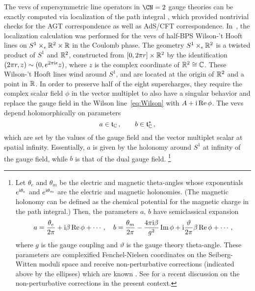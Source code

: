 The vevs of supersymmetric line operators in $\CN=2$
gauge theories can be exactly computed via
localization of the path integral \cite{Pestun:2007rz,Gomis:2011pf},
which provided nontrivial checks for the AGT correspondence
as well as AdS/CFT correspondence.
In~\cite{Ito:2011ea}, the localization calculation was performed
for the vevs of
half-BPS Wilson-'t Hooft lines on $S^1 \times_\epsilon \mathbb{R}^2 \times \mathbb{R}$ in
the Coulomb phase.
The geometry $S^1 \times_\epsilon \mathbb{R}^2$ is a twisted product of $S^1$ and
$\mathbb{R}^2$, constructed from $[0,2\pi r] \times \mathbb{R}^2$ by the
identification $(2\pi r,z) \sim (0, e^{2\pi\mathrm{i}\epsilon} z)$, where $z$ is
the complex coordinate of $\mathbb{R}^2 \cong \mathbb{C}$.  These Wilson-'t Hooft
lines wind around $S^1$, and are located at the origin of $\mathbb{R}^2$ and a
point in $\mathbb{R}$.  In order to preserve half of the eight supercharges,
they require the complex scalar field $\phi$ in the vector multiplet
to also have a singular behavior and replace the gauge field in the
Wilson line~\eqref{eq:Wilson} with $A + \mathrm{i}\mathop{\mathrm{Re}}\nolimits\phi$.  The vevs depend
holomorphically on parameters
\begin{equation}
  a \in \mathfrak{t}_{\mathbb{C}} \,,
  \qquad
  b \in \mathfrak{t}^*_{\mathbb{C}} \,,
\end{equation}
which are set by the values of the gauge field and the vector
multiplet scalar at spatial infinity.  Essentially, $a$ is given by
the holonomy around $S^1$ at infinity of the gauge field, while $b$ is
that of the dual gauge field.%
%
\footnote{Let $\theta_e$ and $\theta_m$ be the electric and magnetic theta-angles
whose exponentials $e^{\mathrm{i}\theta_e}$ and $e^{\mathrm{i}\theta_m}$ are the electric and magnetic holonomies.
(The magnetic holonomy can be defined as the chemical potential for the magnetic charge in the path integral.)
Then, the parameters $a,\,b$ have semiclassical expansion
\begin{equation}
  a = \frac{\theta_e}{2\pi} + \mathrm{i}\beta\mathop{\mathrm{Re}}\nolimits\phi + \cdots,
  \quad
  b = \frac{\theta_m}{2\pi} - \frac{4\pi\mathrm{i}\beta}{g^2}\mathop{\mathrm{Im}}\nolimits\phi + \mathrm{i}\frac{\vartheta}{2\pi}\beta\mathop{\mathrm{Re}}\nolimits\phi + \cdots,
\end{equation}
where $g$ is the gauge coupling and $\vartheta$ is the gauge theory theta-angle.
These parameters are complexified Fenchel-Nielsen coordinates on the Seiberg-Witten moduli space
and receive non-perturbative corrections (indicated above by the ellipses)
which are known \cite{Gaiotto:2008cd}. See \cite{Brennan:2019hzm} for a recent discussion on the non-perturbative corrections
in the present context.}
%


